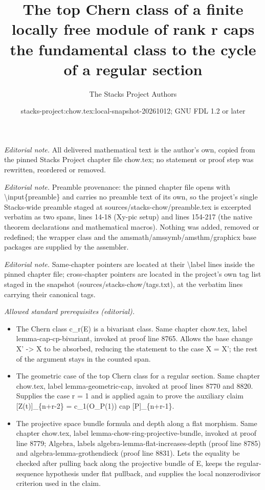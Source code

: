 \documentclass[10pt,a4paper]{amsart}
\title{The top Chern class of a finite locally free module of rank r caps the fundamental class to the cycle of a regular section}
\author{The Stacks Project Authors}
\date{stacks-project:chow.tex:local-snapshot-20261012; GNU FDL 1.2 or later}
\theoremstyle{plain}
\theoremstyle{definition}
\theoremstyle{remark}
\numberwithin{equation}{subsection}
\begin{document}
\maketitle
\noindent\textit{Editorial note.} All delivered mathematical text is the author's own, copied from the pinned Stacks Project chapter file chow.tex; no statement or proof step was rewritten, reordered or removed.\par\medskip
\noindent\textit{Editorial note.} Preamble provenance: the pinned chapter file opens with \textbackslash{}input\{preamble\} and carries no preamble text of its own, so the project's single Stacks-wide preamble staged at sources/stacks-chow/preamble.tex is excerpted verbatim as two spans, lines 14-18 (Xy-pic setup) and lines 154-217 (the native theorem declarations and mathematical macros). Nothing was added, removed or redefined; the wrapper class and the amsmath/amssymb/amsthm/graphicx base packages are supplied by the assembler.\par\medskip
\noindent\textit{Editorial note.} Same-chapter pointers are located at their \textbackslash{}label lines inside the pinned chapter file; cross-chapter pointers are located in the project's own tag list staged in the snapshot (sources/stacks-chow/tags.txt), at the verbatim lines carrying their canonical tags.\par\medskip
\noindent\textit{Allowed standard prerequisites (editorial).}\begin{itemize}
\item The Chern class c\_r(E) is a bivariant class. Same chapter chow.tex, label lemma-cap-cp-bivariant, invoked at proof line 8765. Allows the base change X' -> X to be absorbed, reducing the statement to the case X = X'; the rest of the argument stays in the counted span.
\item The geometric case of the top Chern class for a regular section. Same chapter chow.tex, label lemma-geometric-cap, invoked at proof lines 8770 and 8820. Supplies the case r = 1 and is applied again to prove the auxiliary claim [Z(t)]\_\{n+r-2\} = c\_1(O\_P(1)) cap [P]\_\{n+r-1\}.
\item The projective space bundle formula and depth along a flat morphism. Same chapter chow.tex, label lemma-chow-ring-projective-bundle, invoked at proof line 8779; Algebra, labels algebra-lemma-flat-increases-depth (proof line 8785) and algebra-lemma-grothendieck (proof line 8831). Lets the equality be checked after pulling back along the projective bundle of E, keeps the regular-sequence hypothesis under flat pullback, and supplies the local nonzerodivisor criterion used in the claim.
\end{itemize}\medskip
\end{document}
